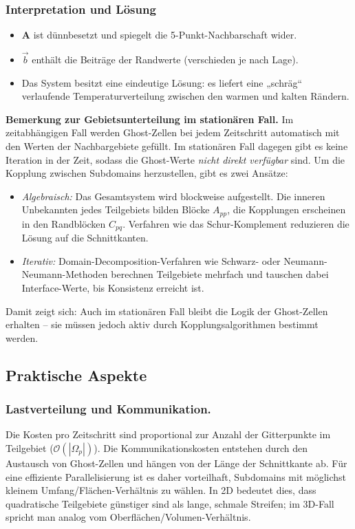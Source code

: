 \subsubsection*{Interpretation und Lösung}
\begin{itemize}
	\item $\mathbf{A}$ ist dünnbesetzt und spiegelt die 5-Punkt-Nachbarschaft wider.
	\item $\vec{b}$ enthält die Beiträge der Randwerte (verschieden je nach Lage).
	\item Das System besitzt eine eindeutige Lösung: es liefert eine „schräg“ verlaufende Temperaturverteilung zwischen den warmen und kalten Rändern.
\end{itemize}

\medskip
\noindent
\textbf{Bemerkung zur Gebietsunterteilung im stationären Fall.}  
Im zeitabhängigen Fall werden Ghost-Zellen bei jedem Zeitschritt automatisch mit den Werten der Nachbargebiete gefüllt.  
Im stationären Fall dagegen gibt es keine Iteration in der Zeit, sodass die Ghost-Werte \emph{nicht direkt verfügbar} sind.  
Um die Kopplung zwischen Subdomains herzustellen, gibt es zwei Ansätze:
\begin{itemize}
	\item \emph{Algebraisch:} Das Gesamtsystem wird blockweise aufgestellt. Die inneren Unbekannten jedes Teilgebiets bilden Blöcke $A_{pp}$, die Kopplungen erscheinen in den Randblöcken $C_{pq}$. Verfahren wie das Schur-Komplement reduzieren die Lösung auf die Schnittkanten.
	\item \emph{Iterativ:} Domain-Decomposition-Verfahren wie Schwarz- oder Neumann-Neumann-Methoden berechnen Teilgebiete mehrfach und tauschen dabei Interface-Werte, bis Konsistenz erreicht ist.
\end{itemize}
Damit zeigt sich: Auch im stationären Fall bleibt die Logik der Ghost-Zellen erhalten – sie müssen jedoch aktiv durch Kopplungsalgorithmen bestimmt werden.


\subsection{Praktische Aspekte}

\subsubsection {Lastverteilung und Kommunikation.}
Die Kosten pro Zeitschritt sind proportional zur Anzahl der Gitterpunkte im Teilgebiet 
($\mathcal{O}(|\Omega_p|)$).  
Die Kommunikationskosten entstehen durch den Austausch von Ghost-Zellen und hängen von der Länge der Schnittkante ab.  
Für eine effiziente Parallelisierung ist es daher vorteilhaft, Subdomains mit möglichst kleinem 
Umfang/Flächen-Verhältnis zu wählen.  
In 2D bedeutet dies, dass quadratische Teilgebiete günstiger sind als lange, schmale Streifen; 
im 3D-Fall spricht man analog vom Oberflächen/Volumen-Verhältnis.  

